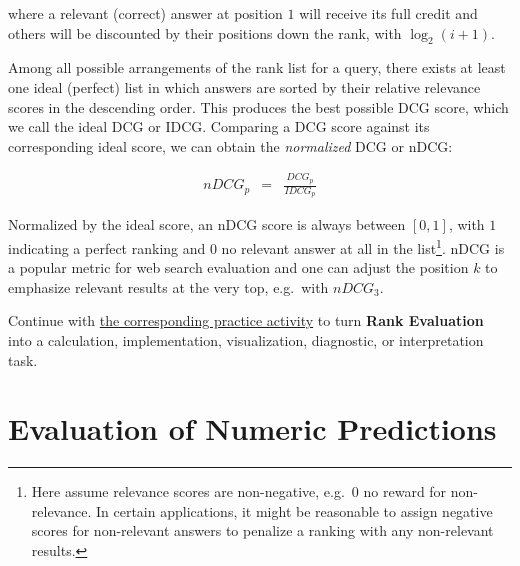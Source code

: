 \documentclass[
  letterpaper,
]{scrbook}
\begin{document}
where a relevant (correct) answer at position \(1\) will receive its
full credit and others will be discounted by their positions down the
rank, with \(\log_2(i+1)\).

Among all possible arrangements of the rank list for a query, there
exists at least one ideal (perfect) list in which answers are sorted by
their relative relevance scores in the descending order. This produces
the best possible DCG score, which we call the ideal DCG or IDCG.
Comparing a DCG score against its corresponding ideal score, we can
obtain the \emph{normalized} DCG or nDCG:

\[\begin{aligned}
  nDCG_p & = & \frac{DCG_p}{IDCG_p}
\end{aligned}\]

Normalized by the ideal score, an nDCG score is always between
\([0, 1]\), with \(1\) indicating a perfect ranking and \(0\) no
relevant answer at all in the list\footnote{Here assume relevance scores
  are non-negative, e.g.~\(0\) no reward for non-relevance. In certain
  applications, it might be reasonable to assign negative scores for
  non-relevant answers to penalize a ranking with any non-relevant
  results.}. nDCG is a popular metric for web search evaluation and one
can adjust the position \(k\) to emphasize relevant results at the very
top, e.g.~with \(nDCG_3\).

\begin{tcolorbox}[enhanced jigsaw, arc=.35mm, bottomrule=.15mm, bottomtitle=1mm, breakable, colback=white, colbacktitle=quarto-callout-tip-color!10!white, colframe=quarto-callout-tip-color-frame, coltitle=black, left=2mm, leftrule=.75mm, opacityback=0, opacitybacktitle=0.6, rightrule=.15mm, title=\textcolor{quarto-callout-tip-color}{\faLightbulb}\hspace{0.5em}{Put it into practice}, titlerule=0mm, toprule=.15mm, toptitle=1mm]

Continue with \hyperref[sec-pr-14-rank-evaluation]{the corresponding
practice activity} to turn \textbf{Rank Evaluation} into a calculation,
implementation, visualization, diagnostic, or interpretation task.

\end{tcolorbox}

\section{Evaluation of Numeric
Predictions}\label{evaluation-of-numeric-predictions}
\end{document}
